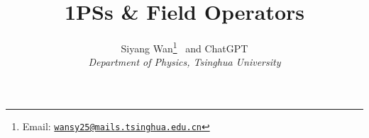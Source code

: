 \documentclass[a4paper,12pt]{article}
\newcommand{\fnemail}[1]{\footnote{Email: \href{mailto:#1}{\nolinkurl{#1}}}}
\numberwithin{equation}{section}
\begin{document}
    \title{\Large\textbf{1PSs \& Field Operators}}
    \author{Siyang Wan\fnemail{wansy25@mails.tsinghua.edu.cn} \ and ChatGPT\\[5mm] \normalsize{\emph{Department of Physics, Tsinghua University}}}
    \date{}
    \maketitle
    \tableofcontents
    \newpage
    
    
    
    
    
\end{document}
